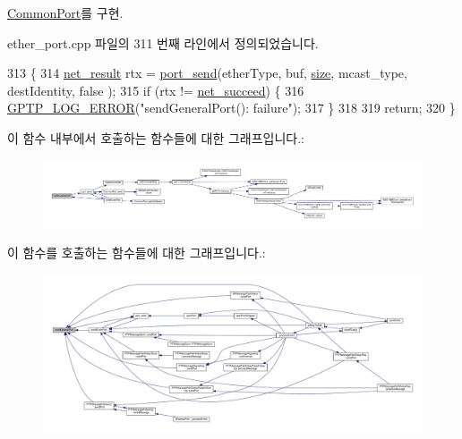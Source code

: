 \hyperlink{class_common_port_a03f7724f30d3559245970e517b977a82}{Common\+Port}를 구현.



ether\+\_\+port.\+cpp 파일의 311 번째 라인에서 정의되었습니다.


\begin{DoxyCode}
313 \{
314     \hyperlink{avbts__osnet_8hpp_a21b2b4b5e479ef3adfc039ac30c961cd}{net\_result} rtx = \hyperlink{class_ether_port_a608936cc036ef22825732a04d1eed7d8}{port\_send}(etherType, buf, \hyperlink{gst__avb__playbin_8c_a439227feff9d7f55384e8780cfc2eb82}{size}, mcast\_type, destIdentity, \textcolor{keyword}{false}
      );
315     \textcolor{keywordflow}{if} (rtx != \hyperlink{avbts__osnet_8hpp_a21b2b4b5e479ef3adfc039ac30c961cda349eff10b7ad8aef2477575f9306e579}{net\_succeed}) \{
316         \hyperlink{gptp__log_8hpp_afefbb1009717c128012bfeed94842987}{GPTP\_LOG\_ERROR}(\textcolor{stringliteral}{"sendGeneralPort(): failure"});
317     \}
318 
319     \textcolor{keywordflow}{return};
320 \}
\end{DoxyCode}


이 함수 내부에서 호출하는 함수들에 대한 그래프입니다.\+:
\nopagebreak
\begin{figure}[H]
\begin{center}
\leavevmode
\includegraphics[width=350pt]{class_ether_port_a9de15e5c639faaf04407f126e241358a_cgraph}
\end{center}
\end{figure}




이 함수를 호출하는 함수들에 대한 그래프입니다.\+:
\nopagebreak
\begin{figure}[H]
\begin{center}
\leavevmode
\includegraphics[width=350pt]{class_ether_port_a9de15e5c639faaf04407f126e241358a_icgraph}
\end{center}
\end{figure}


